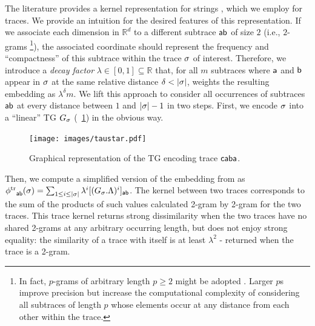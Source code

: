 The literature provides a kernel representation for strings \cite{LodhiSSCW02,GartnerFW03}, which we employ for
traces. We provide an intuition for the desired features of this representation. If we associate each dimension in $\mathbb{R}^d$
to a different subtrace $\mathsf{a}\mathsf{b}$ of size $2$ (i.e., $2$-grams%
\footnote{In fact, $p$-grams of arbitrary length $p\geq 2$ might be adopted \cite{Gartner03}. Larger $p$s improve precision
but increase the computational complexity of considering all subtraces of length $p$ whose elements occur at any
distance from each other within the trace.}),
the associated coordinate should represent the frequency and ``compactness'' of this subtrace within the trace $\sigma$ of
interest. Therefore, we introduce a \emph{decay factor} $\lambda\in[0,1]\subseteq\mathbb{R}$ that, for all $m$ subtraces where $\mathsf{a}$ and $\mathsf{b}$ appear in $\sigma$ at the same relative distance $\delta < |\sigma|$, weights the resulting embedding as $\lambda^\delta m$.
%
We lift this approach to consider all occurrences of subtraces $\mathsf{a}\mathsf{b}$ at every distance between $1$ and $|\sigma|-1$
in two steps. First, we encode $\sigma$ into a ``linear'' TG $G_\sigma$ (\figurename~\ref{fig:taustar}) in the obvious way.
%
\begin{figure}[!t]
	\centering
	\texttt{[image: images/taustar.pdf]}
	\caption{Graphical representation of the TG encoding trace $\mathsf{caba}$.}
	\label{fig:taustar}
\end{figure}
%
Then, we compute a simplified version of the embedding from \cite{LodhiSSCW02} as
${\phi^{\text{tr}}}_{\mathsf{a}\mathsf{b}}(\sigma)=\sum_{1\leq i\leq |\sigma|}\lambda^i[(G_{\sigma}.\Lambda)^i]_{\mathsf{a}\mathsf{b}}$.
The kernel between two traces corresponds to the sum of the products of such values calculated 2-gram by 2-gram for the two
traces. This trace kernel returns strong dissimilarity when the two traces have no shared 2-grams at any arbitrary occurring length,
but does not enjoy strong equality: the similarity of a trace with itself is at least $\lambda^2$ - returned when the trace is a
2-gram.

%

